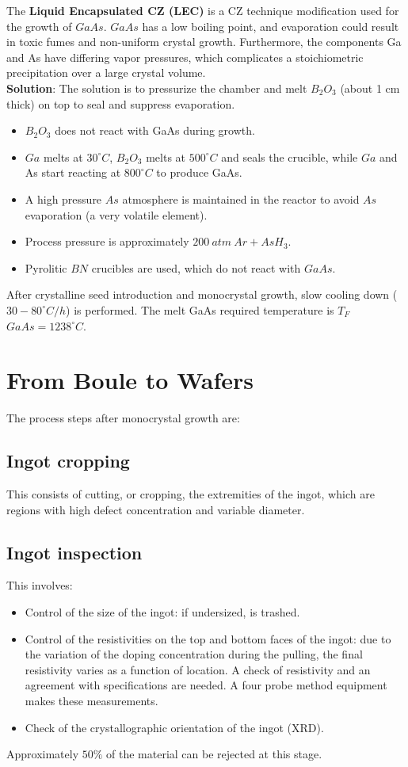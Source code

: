 \documentclass{report}
\begin{document}
The \textbf{Liquid Encapsulated CZ (LEC)} is a CZ technique modification used for the growth of $GaAs$. $GaAs$ has a low boiling point, and evaporation could result in toxic fumes and non-uniform crystal growth. Furthermore, the components Ga and As have differing vapor pressures, which complicates a stoichiometric precipitation over a large crystal volume.\\
\textbf{Solution}: 
The solution is to pressurize the chamber and melt $B_{2}O_{3}$ (about 1 cm thick) on top to seal and suppress evaporation.
\begin{itemize}
    \item $B_{2}O_{3}$ does not react with GaAs during growth.
    \item $Ga$ melts at $30^{\circ}C$, $B_{2}O_{3}$ melts at $500^{\circ}C$ and seals the crucible, while $Ga$ and As start reacting at $800^{\circ}C$ to produce GaAs.
    \item A high pressure $As$ atmosphere is maintained in the reactor to avoid $As$ evaporation (a very volatile element).
    \item Process pressure is approximately $200~atm~Ar+AsH_{3}$.
    \item Pyrolitic $BN$ crucibles are used, which do not react with $GaAs$.
\end{itemize}
After crystalline seed introduction and monocrystal growth, slow cooling down ($30-80^{\circ}C/h$) is performed. The melt GaAs required temperature is $T_{F}$ $GaAs=1238^{\circ}C$.

\section{From Boule to Wafers}
The process steps after monocrystal growth are:

\subsection{Ingot cropping}
This consists of cutting, or cropping, the extremities of the ingot, which are regions with high defect concentration and variable diameter.

\subsection{Ingot inspection}
This involves:
\begin{itemize}
\item Control of the size of the ingot: if undersized, is trashed.
    \item Control of the resistivities on the top and bottom faces of the ingot: due to the variation
of the doping concentration during the pulling, the final resistivity varies as a function
of location. A check of resistivity and an agreement with specifications are needed. A
four probe method equipment makes these measurements.
    \item Check of the crystallographic orientation of the ingot (XRD).
\end{itemize}
Approximately $50\%$ of the material can be rejected at this stage.
\end{document}
